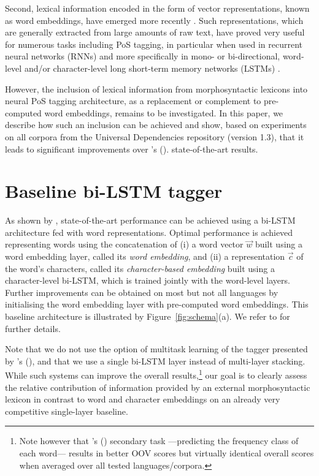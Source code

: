 \documentclass[11pt,letterpaper]{article}
\begin{document}
Second, lexical information encoded in the form of vector representations, known as word embeddings, have
emerged more recently \cite{bengio03,collobert08,chrupala13,ling15,ballesteros15,muller15}. Such representations, which
are generally extracted from large amounts of raw text, have proved very useful for numerous tasks including PoS
tagging, in particular when used in recurrent neural networks (RNNs) and more specifically in mono- or bi-directional,
word-level and/or character-level long short-term memory networks (LSTMs)
\cite{hochreiter97,ling15,ballesteros15,plank16}.

However, the inclusion of lexical information from morphosyntactic lexicons into neural PoS tagging architecture, as a
replacement or complement to pre-computed word embeddings, remains to be investigated. In this paper, we describe how
such an inclusion can be achieved and show, based on experiments on all corpora from the Universal Dependencies
repository (version 1.3), that it leads to significant improvements over \citeauthor{plank16}'s (\citeyear{plank16}).
state-of-the-art results. 


\section{Baseline bi-LSTM tagger}
\label{sec:baselinearchitecture}
As shown by \citet{plank16}, state-of-the-art performance can be achieved using a bi-LSTM architecture fed with word
representations. Optimal performance is achieved representing words using the concatenation of (i) a word vector
$\vec{w}$ built using a word embedding layer, called its {\em word embedding}, and (ii) a representation $\vec{c}$ of
the word's characters, called its {\em character-based embedding} built using a character-level bi-LSTM, which is
trained jointly with the word-level layers. Further improvements can be obtained on most but not all languages by
initialising the word embedding layer with pre-computed word embeddings. This baseline architecture is illustrated by
Figure~\ref{fig:schema}(a). We refer to \citet{plank16} for further details.

Note that we do not use the option of multitask learning of the tagger presented by \citeauthor{plank16}'s
(\citeyear{plank16}), and that we use a single bi-LSTM layer instead of multi-layer stacking. While such systems can
improve the overall results,\footnote{Note however that \citeauthor{plank16}'s (\citeyear{plank16})
    secondary task ---predicting the frequency class of each word--- results in better OOV scores but virtually identical
    overall scores when averaged over all tested languages/corpora.} our goal is to clearly assess the relative
contribution of information provided by an external morphosyntactic lexicon in contrast to word and character embeddings
on an already very competitive single-layer baseline.
\end{document}
